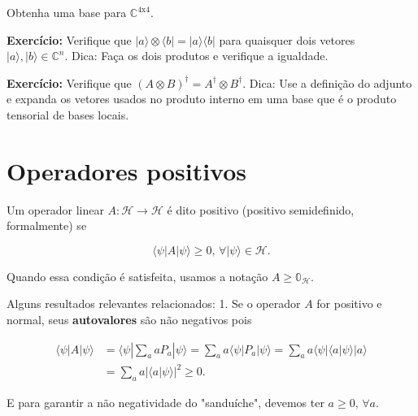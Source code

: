 \documentclass[11pt]{article}
\begin{document}
Obtenha uma base para \(\mathbb{C}^{4\mathrm{x}4}\).

    \textbf{Exercício:} Verifique que
\(|a\rangle\otimes\langle b| = |a\rangle\langle b|\) para quaisquer dois
vetores \(|a\rangle,|b\rangle\in\mathbb{C}^{n}\). Dica: Faça os dois
produtos e verifique a igualdade.

\textbf{Exercício:} Verifique que
\((A\otimes B)^{\dagger}=A^{\dagger}\otimes B^{\dagger}\). Dica: Use a
definição do adjunto e expanda os vetores usados no produto interno em
uma base que é o produto tensorial de bases locais.

    \section{Operadores positivos}\label{operadores-positivos}

Um operador linear \(A:\mathcal{H}\rightarrow\mathcal{H}\) é dito
positivo (positivo semidefinido, formalmente) se

\begin{equation}
\langle \psi|A|\psi\rangle\ge0\text{, }\forall|\psi\rangle\in\mathcal{H}.
\end{equation}

Quando essa condição é satisfeita, usamos a notação
\(A\ge\mathbb{0}_{\mathcal{H}}\).

Alguns resultados relevantes relacionados: 1. Se o operador \(A\) for
positivo e normal, seus \textbf{autovalores} são não negativos pois

\begin{align}
\langle \psi|A|\psi\rangle & = \langle \psi|\sum_{a}aP_{a}|\psi\rangle = \sum_{a}a\langle \psi|P_{a}|\psi\rangle = \sum_{a}a\langle \psi|\langle a|\psi\rangle|a\rangle \\
& = \sum_{a}a|\langle a|\psi\rangle|^{2} \ge 0.
\end{align}

E para garantir a não negatividade do "sanduíche", devemos ter
\(a\ge0\text{, }\forall a\).
\end{document}
